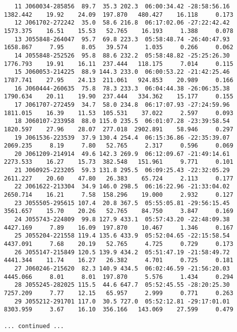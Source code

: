 \begin{landscape}
{\begin{verbatim}
   11 J060034-285856  89.7  35.3 202.3  06:00:34.42 -28:58:56.16 1382.442    19.92    24.09  197.870   480.427    16.118     0.173
   12 J061702-272242  35.0  58.6 216.8  06:17:02.06 -27:22:42.42 1573.375    16.51    15.53   52.765    16.193     1.388     0.078
   13 J055848-264047  95.7  69.8 223.3  05:58:48.74 -26:40:47.93 1658.867     7.95     8.05   39.574     1.035     0.266     0.062
   14 J055848-252526  95.8  88.6 232.2  05:58:48.82 -25:25:26.30 1776.793    19.91    16.11  237.444   118.175     7.014     0.115
   15 J060053-214225  88.9 144.3 233.0  06:00:53.22 -21:42:25.46 1787.741    27.95    24.13  211.061   924.853    20.989     0.166
   16 J060444-260635  75.8  78.3 233.3  06:04:44.38 -26:06:35.38 1790.634    20.11    19.90  237.444   334.362    15.177     0.155
   17 J061707-272459  34.7  58.0 234.8  06:17:07.93 -27:24:59.96 1811.015    16.39    11.53  105.531    37.022     2.597     0.093
   18 J060107-233958  88.0 115.0 235.5  06:01:07.28 -23:39:58.54 1820.597    27.96    28.07  277.018  2902.891    58.946     0.297
   19 J061536-223539  37.9 130.4 254.4  06:15:36.86 -22:35:39.07 2069.235     8.19     7.80   52.765     2.317     0.596     0.069
   20 J061209-214914  49.6 142.3 269.9  06:12:09.67 -21:49:14.61 2273.533    16.27    15.73  382.548   151.961     9.771     0.101
   21 J060925-223205  59.3 131.8 295.5  06:09:25.43 -22:32:05.29 2611.227    20.60    47.80   26.383    65.724     2.113     0.177
   22 J061622-213304  34.9 146.0 298.5  06:16:22.96 -21:33:04.02 2650.714    16.21     7.58  158.296    19.000     2.932     0.127
   23 J055505-295615 107.4  20.8 367.5  05:55:05.81 -29:56:15.45 3561.657    15.70    20.26   52.765    84.750     3.847     0.169
   24 J055743-224809  99.8 127.9 433.1  05:57:43.20 -22:48:09.38 4427.169     7.89    16.09  197.870    10.467     1.346     0.167
   25 J055204-221558 119.4 135.6 433.9  05:52:04.65 -22:15:58.54 4437.091     7.68    20.19   52.765     4.725     0.729     0.173
   26 J055147-215849 120.5 139.9 434.2  05:51:47.19 -21:58:49.72 4441.344    11.74    16.27   26.382     4.701     0.725     0.181
   27 J060246-215620  82.3 140.9 434.5  06:02:46.59 -21:56:20.03 4445.066     8.01     8.01  197.870     5.576     1.434     0.294
   28 J055245-282025 115.5  44.6 647.7  05:52:45.55 -28:20:25.30 7257.209     7.77    12.15   65.957     2.999     0.771     0.263
   29 J055212-291701 117.0  30.5 727.0  05:52:12.81 -29:17:01.01 8303.959     3.67    16.10  356.166   143.069    27.599     0.479

... continued ...


\end{verbatim}}
\end{landscape}
